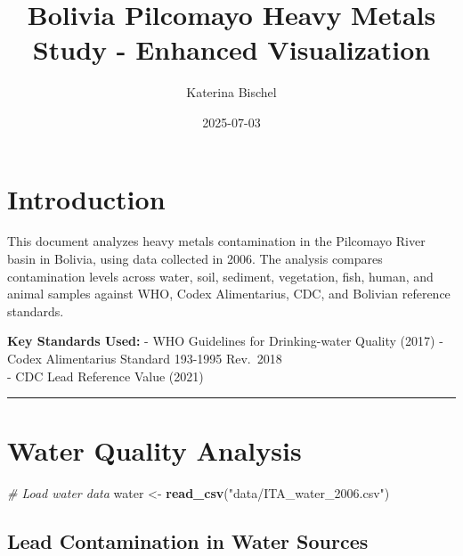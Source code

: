 \documentclass[
]{article}
\title{Bolivia Pilcomayo Heavy Metals Study - Enhanced Visualization}
\author{Katerina Bischel}
\date{2025-07-03}
\newenvironment{Shaded}{\begin{snugshade}}{\end{snugshade}}
\newcommand{\CommentTok}[1]{\textcolor[rgb]{0.56,0.35,0.01}{\textit{#1}}}
\newcommand{\FunctionTok}[1]{\textcolor[rgb]{0.13,0.29,0.53}{\textbf{#1}}}
\newcommand{\NormalTok}[1]{#1}
\newcommand{\OtherTok}[1]{\textcolor[rgb]{0.56,0.35,0.01}{#1}}
\newcommand{\StringTok}[1]{\textcolor[rgb]{0.31,0.60,0.02}{#1}}
\begin{document}
\maketitle

{
\setcounter{tocdepth}{2}
\tableofcontents
}
\section{Introduction}\label{introduction}

This document analyzes heavy metals contamination in the Pilcomayo River
basin in Bolivia, using data collected in 2006. The analysis compares
contamination levels across water, soil, sediment, vegetation, fish,
human, and animal samples against WHO, Codex Alimentarius, CDC, and
Bolivian reference standards.

\textbf{Key Standards Used:} - WHO Guidelines for Drinking-water Quality
(2017) - Codex Alimentarius Standard 193-1995 Rev.~2018\\
- CDC Lead Reference Value (2021)

\begin{center}\rule{0.5\linewidth}{0.5pt}\end{center}

\section{Water Quality Analysis}\label{water-quality-analysis}

\begin{Shaded}
\begin{Highlighting}[]
\CommentTok{\# Load water data}
\NormalTok{water }\OtherTok{\textless{}{-}} \FunctionTok{read\_csv}\NormalTok{(}\StringTok{"data/ITA\_water\_2006.csv"}\NormalTok{)}
\end{Highlighting}
\end{Shaded}

\subsection{Lead Contamination in Water
Sources}\label{lead-contamination-in-water-sources}
\end{document}
